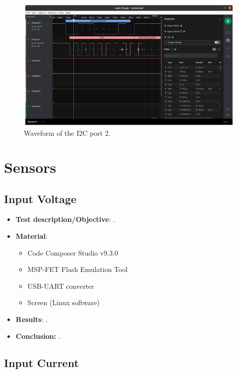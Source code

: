 \begin{figure}[!ht]
    \begin{center}
        \includegraphics[width=\columnwidth]{figures/v07/obdh2-ant-i2c.png}
        \caption{Waveform of the I2C port 2.}
        \label{fig:test-i2c-2}
    \end{center}
\end{figure}

\section{Sensors}

\subsection{Input Voltage}

\begin{itemize}
    \item \textbf{Test description/Objective}: .
    \item \textbf{Material}:
        \begin{itemize}
            \item Code Composer Studio v9.3.0
            \item MSP-FET Flash Emulation Tool
            \item USB-UART converter
            \item Screen (Linux software)
        \end{itemize}
    \item \textbf{Results}: .
    \item \textbf{Conclusion:} .
\end{itemize}

\subsection{Input Current}

